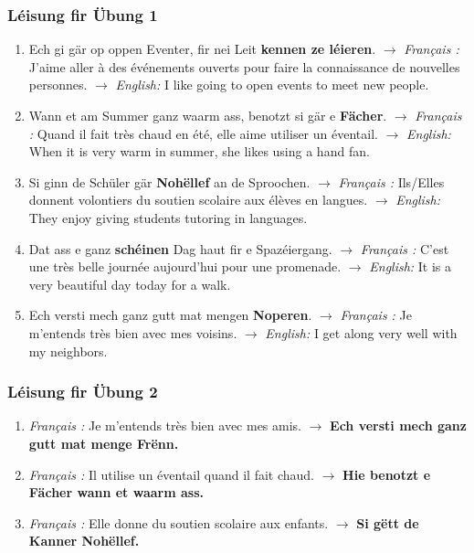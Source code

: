 \subsubsection*{Léisung fir Übung 1}
\begin{enumerate}
    \item Ech gi gär op oppen Eventer, fir nei Leit \textbf{kennen ze léieren}.
    $\rightarrow$ \textit{Français :} J'aime aller à des événements ouverts pour faire la connaissance de nouvelles personnes.
    $\rightarrow$ \textit{English:} I like going to open events to meet new people.

    \item Wann et am Summer ganz waarm ass, benotzt si gär e \textbf{Fächer}.
    $\rightarrow$ \textit{Français :} Quand il fait très chaud en été, elle aime utiliser un éventail.
    $\rightarrow$ \textit{English:} When it is very warm in summer, she likes using a hand fan.

    \item Si ginn de Schüler gär \textbf{Nohëllef} an de Sproochen.
    $\rightarrow$ \textit{Français :} Ils/Elles donnent volontiers du soutien scolaire aux élèves en langues.
    $\rightarrow$ \textit{English:} They enjoy giving students tutoring in languages.

    \item Dat ass e ganz \textbf{schéinen} Dag haut fir e Spazéiergang.
    $\rightarrow$ \textit{Français :} C'est une très belle journée aujourd'hui pour une promenade.
    $\rightarrow$ \textit{English:} It is a very beautiful day today for a walk.

    \item Ech versti mech ganz gutt mat mengen \textbf{Noperen}.
    $\rightarrow$ \textit{Français :} Je m'entends très bien avec mes voisins.
    $\rightarrow$ \textit{English:} I get along very well with my neighbors.
\end{enumerate}

\subsubsection*{Léisung fir Übung 2}
\begin{enumerate}
    \item \textit{Français :} Je m'entends très bien avec mes amis.
    $\rightarrow$ \textbf{Ech versti mech ganz gutt mat menge Frënn.}

    \item \textit{Français :} Il utilise un éventail quand il fait chaud.
    $\rightarrow$ \textbf{Hie benotzt e Fächer wann et waarm ass.}

    \item \textit{Français :} Elle donne du soutien scolaire aux enfants.
    $\rightarrow$ \textbf{Si gëtt de Kanner Nohëllef.}
\end{enumerate}

